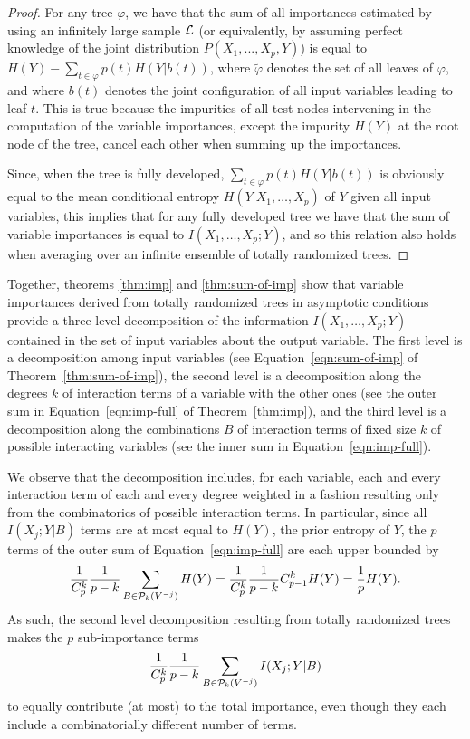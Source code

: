 \begin{proof}
For any tree $\varphi$, we have that the sum of all importances estimated by
using an infinitely large sample $\cal L$ (or equivalently, by assuming perfect
knowledge of the joint distribution $P(X_1, ..., X_p, Y)$) is equal to $H(Y) -
\sum_{t \in \widetilde{\varphi}} p(t) H(Y|b(t))$, where $\widetilde{\varphi}$
denotes the set of all leaves of $\varphi$, and where $b(t)$  denotes the joint
configuration of all input variables leading to leaf $t$. This is true because
the impurities of all test nodes intervening in the computation of the variable
importances, except the impurity $H(Y)$ at the root node of the tree, cancel
each other when summing up the importances.

Since, when the tree is fully developed, $\sum_{t \in \widetilde{\varphi}} p(t)
H(Y|b(t))$ is obviously equal to the mean conditional entropy $H(Y | X_{1},
\ldots, X_{p})$ of $Y$ given all input variables, this implies that for any
fully developed tree we have that the sum of variable importances is equal to
$I(X_{1}, \ldots, X_{p} ; Y)$, and so this relation also holds when averaging
over an infinite ensemble of totally randomized trees.
\end{proof}

Together, theorems \ref{thm:imp} and \ref{thm:sum-of-imp} show that  variable
importances derived from totally randomized trees in asymptotic conditions
provide a three-level decomposition of the information $I(X_{1}, \ldots, X_{p}
; Y)$ contained in the set of input variables about the output variable. The
first level is a decomposition among input variables (see Equation~\ref{eqn:sum-of-imp}
of Theorem~\ref{thm:sum-of-imp}),  the second level is a
decomposition along the degrees $k$ of interaction terms of a variable with the
other ones (see the outer sum in Equation~\ref{eqn:imp-full} of
Theorem~\ref{thm:imp}), and the third level is a decomposition along the
combinations $B$ of interaction terms of fixed size $k$ of possible interacting
variables (see the inner sum in Equation~\ref{eqn:imp-full}).

We observe that the decomposition includes, for each variable, each and every
interaction term of each and every degree weighted in a fashion resulting only
from the combinatorics of possible interaction terms. In particular, since all
$I(X_j;Y|B)$ terms are at most equal to $H(Y)$, the prior entropy of $Y$,  the
$p$ terms of the outer sum of Equation~\ref{eqn:imp-full} are each upper
bounded by
\begin{equation}
\frac{1}{C^k_p}\frac{1}{p-k}\sum_{B \in {\cal P}_k(V^{-j})}
H(Y)=\frac{1}{C^k_p} \frac{1}{p-k} {C^k_{p-1}} H(Y) = \frac{1}{p}H(Y).
\end{equation}
As such,
the second level decomposition resulting from totally randomized trees makes the
$p$ sub-importance terms
\begin{equation}
\frac{1}{C^k_p} \frac{1}{p-k} \sum_{B \in {\cal P}_k(V^{-j})} I(X_j;Y|B)
\end{equation}
to equally contribute (at most) to the total
importance, even though they each include a combinatorially different number of
terms.


